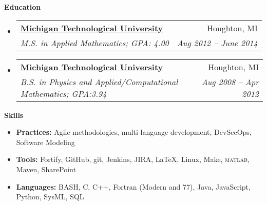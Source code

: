 \documentclass[letterpaper,11pt]{article}
\makeatletter
\newcommand{\resitem}[1]{\item #1 \vspace{-2pt}}
\newcommand{\resheading}[1]{{\large \textbf{#1}}}
\newcommand{\ressubheading}[4]{
\begin{tabular*}{6.5in}{l@{\extracolsep{\fill}}r}
		\textbf{#1} & #2 \\
		\textit{#3} & \textit{#4} \\
\end{tabular*}\vspace{-6pt}}
\makeatother
\begin{document}
\resheading{Education}
	\begin{itemize}
		\item
			\ressubheading{\href{www.mtu.edu}{Michigan Technological University}}{Houghton, MI}{M.S. in Applied Mathematics; GPA: 4.00}{Aug 2012 -- June 2014}
                                           \begin{comment}
				{ \footnotesize
				\begin{itemize}
					\resitem{Advisor: Dr. Jiguang Sun} 
				\end{itemize}
				}
                                          \end{comment}
		\item
			\ressubheading{\href{www.mtu.edu}{Michigan Technological University}}{Houghton, MI}{B.S. in Physics and Applied/Computational Mathematics; GPA:3.94}{Aug 2008 -- Apr 2012}
                                           \begin{comment}
				{ \footnotesize
				\begin{itemize}
					\resitem{Graduated Summa Cum Laude} 
				\end{itemize}
				}
                                          \end{comment}
\begin{comment}%
		\item
			\ressubheading{\href{http://www.isd12.org/chs/}{Centennial High School}}{Circle Pines, MN}{GPA:3.79}{Sep. 2003 - June 2008}
                                           \begin{comment}
				{ \footnotesize
				\begin{itemize}
				\resitem{Graduated with honors}
				\end{itemize}
				}
\end{comment}
	\end{itemize} %


\resheading{Skills}
\begin{itemize}
  \resitem{\textbf{Practices:} Agile methodologies, multi-language development, DevSecOps, Software Modeling}
  \resitem{\textbf{Tools:} Fortify, GitHub, git, Jenkins, JIRA,  \LaTeX, Linux, Make, \textsc{matlab}, Maven, SharePoint}
  \resitem{\textbf{Languages:} BASH, C, C++, Fortran (Modern and 77), Java, JavaScript, Python, SysML, SQL}
\end{itemize}
\end{document}

